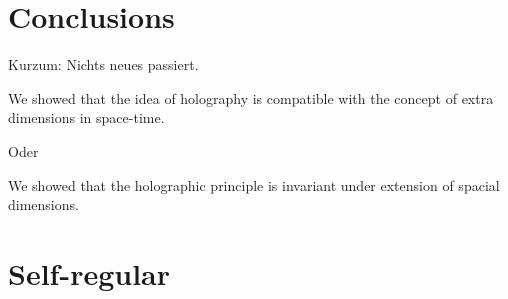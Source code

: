 \documentclass[10pt,a4paper, fleqn]{article}
\begin{document}
\section{Conclusions}
Kurzum: Nichts neues passiert.

We showed that the idea of holography is compatible
with the concept of extra dimensions in space-time.

Oder

We showed that the holographic principle is invariant
under extension of spacial dimensions.




\section{Self-regular }





{}
%
%
%
%
%
%
%
%
\end{document}
